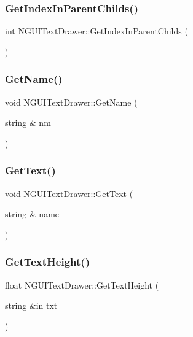 \subsubsection{\texorpdfstring{Get\+Index\+In\+Parent\+Childs()}{GetIndexInParentChilds()}}
{\footnotesize\ttfamily int N\+G\+U\+I\+Text\+Drawer\+::\+Get\+Index\+In\+Parent\+Childs (\begin{DoxyParamCaption}{ }\end{DoxyParamCaption})}

\hypertarget{class_n_g_u_i_text_drawer_acfd91a85c3f080cca9ab2823451f53fe}{}\label{class_n_g_u_i_text_drawer_acfd91a85c3f080cca9ab2823451f53fe} 
\subsubsection{\texorpdfstring{Get\+Name()}{GetName()}}
{\footnotesize\ttfamily void N\+G\+U\+I\+Text\+Drawer\+::\+Get\+Name (\begin{DoxyParamCaption}\item[{string \&}]{nm }\end{DoxyParamCaption})}

\hypertarget{class_n_g_u_i_text_drawer_a9d25a99321c520f17606859a76e886b7}{}\label{class_n_g_u_i_text_drawer_a9d25a99321c520f17606859a76e886b7} 
\subsubsection{\texorpdfstring{Get\+Text()}{GetText()}}
{\footnotesize\ttfamily void N\+G\+U\+I\+Text\+Drawer\+::\+Get\+Text (\begin{DoxyParamCaption}\item[{string \&}]{name }\end{DoxyParamCaption})}

\hypertarget{class_n_g_u_i_text_drawer_af6bb86051e724b231808e6aca6d9b9ad}{}\label{class_n_g_u_i_text_drawer_af6bb86051e724b231808e6aca6d9b9ad} 
\subsubsection{\texorpdfstring{Get\+Text\+Height()}{GetTextHeight()}}
{\footnotesize\ttfamily float N\+G\+U\+I\+Text\+Drawer\+::\+Get\+Text\+Height (\begin{DoxyParamCaption}\item[{string \&in}]{txt }\end{DoxyParamCaption})}

